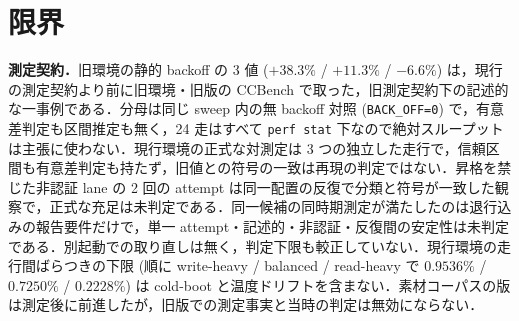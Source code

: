 \documentclass[submit,techrep,noauthor]{ipsj}
\begin{document}
\section{限界}
\label{sec:limits}

\textbf{測定契約．}旧環境の静的 backoff の 3 値 ($+38.3\%$ / $+11.3\%$ / $-6.6\%$) は，現行の測定契約より前に旧環境・旧版の CCBench で取った，旧測定契約下の記述的な一事例である．分母は同じ sweep 内の無 backoff 対照 (\texttt{BACK\_OFF=0}) で，有意差判定も区間推定も無く，24 走はすべて \texttt{perf stat} 下なので絶対スループットは主張に使わない．現行環境の正式な対測定は 3 つの独立した走行で，信頼区間も有意差判定も持たず，旧値との符号の一致は再現の判定ではない．昇格を禁じた非認証 lane の 2 回の attempt は同一配置の反復で分類と符号が一致した観察で，正式な充足は未判定である．同一候補の同時期測定が満たしたのは退行込みの報告要件だけで，単一 attempt・記述的・非認証・反復間の安定性は未判定である．別起動での取り直しは無く，判定下限も較正していない．現行環境の走行間ばらつきの下限 (順に write-heavy / balanced / read-heavy で $0.9536\%$ / $0.7250\%$ / $0.2228\%$) は cold-boot と温度ドリフトを含まない．素材コーパスの版は測定後に前進したが，旧版での測定事実と当時の判定は無効にならない．
\end{document}
